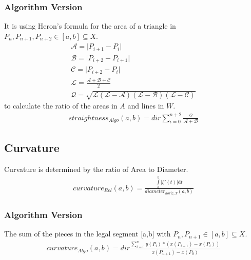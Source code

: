 \documentclass{report}
\begin{document}
\subsubsection{Algorithm Version}
It is using Heron's formula for the area of a triangle in $P_{n}, P_{n+1},P_{n+2} \in [a,b] \subseteq X$.
\begin{align*}
\mathcal{A}=\lvert P_{i+1}-P_{i} \rvert\\
\mathcal{B}=\lvert P_{i+2} - P_{i+1} \rvert\\
\mathcal{C}=\lvert P_{i+2} - P_{i} \rvert\\
\mathcal{L}=\frac{\mathcal{A}+\mathcal{B}+\mathcal{C}}{2}\\
\mathcal{Q}=\sqrt{\mathcal{L}(\mathcal{L}-\mathcal{A})(\mathcal{L}-\mathcal{B})(\mathcal{L}-\mathcal{C})}
\end{align*}
to calculate the ratio of the areas in $A$ and lines in $W$.
\begin{align}
straightness_{Algo}(a,b)=dir \sum_{i=0}^{n+2}\frac{\mathcal{Q}}{\mathcal{A}+\mathcal{B}}
\end{align}

\subsection{Curvature}
Curvature is determined by the ratio of Area to Diameter.
\begin{align}
curvature_{Rel}(a,b) = \frac{\int \limits _{a}^{b} \lvert \xi'(t) \rvert \mathrm{d}t}{diameter_{horiz,T}(a,b)}
\end{align}
\subsubsection{Algorithm Version}
The sum of the pieces in the legal segment [a,b] with $P_{n}, P_{n+1} \in [a,b] \subseteq X$.
\begin{align}
curvature_{Algo}(a,b)= dir \frac{\sum \limits _{i=0}^{n}y(P_{i})*(x(P_{i+1})-x(P_{i}))}{x(P_{n+1})-x(P_{0})}
\end{align}
\end{document}
